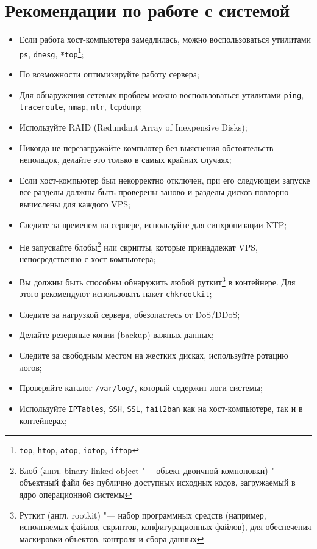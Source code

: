 \section{Рекомендации по работе с системой}
\begin{itemize}
    \item Если работа хост-компьютера замедлилась, можно воспользоваться утилитами \texttt{ps}, \texttt{dmesg}, \texttt{*top}\footnote{\texttt{top}, \texttt{htop}, \texttt{atop}, \texttt{iotop}, \texttt{iftop}};
    \item По возможности оптимизируйте работу сервера;
    \item Для обнаружения сетевых проблем можно воспользоваться утилитами \texttt{ping}, \texttt{traceroute}, \texttt{nmap}, \texttt{mtr}, \texttt{tcpdump};
    \item Используйте RAID (Redundant Array of Inexpensive Disks);
    \item Никогда не перезагружайте компьютер без выяснения обстоятельств неполадок, делайте это только в самых крайних случаях;
    \item Если хост-компьютер был некорректно отключен, при его следующем запуске все разделы должны быть проверены заново и разделы дисков повторно вычислены для каждого VPS;
    \item Следите за временем на сервере, используйте для синхронизации NTP;
    \item Не запускайте блобы\footnote{Блоб (англ. binary linked object "--- объект двоичной компоновки) "--- объектный файл без публично доступных исходных кодов, загружаемый в ядро операционной системы} или скрипты, которые принадлежат VPS, непосредственно с хост-компьютера;
    \item Вы должны быть способны обнаружить любой руткит\footnote{Руткит (англ. rootkit) "--- набор программных средств (например, исполняемых файлов, скриптов, конфигурационных файлов), для обеспечения маскировки объектов, контроля и сбора данных} в контейнере. Для этого рекомендуют использовать пакет \texttt{chkrootkit};
    \item Следите за нагрузкой сервера, обезопастесь от DoS/DDoS;
    \item Делайте резервные копии (backup) важных данных;
    \item Следите за свободным местом на жестких дисках, используйте ротацию логов;
    \item Проверяйте каталог \texttt{/var/log/}, который содержит логи системы;
    \item Используйте \texttt{IPTables}, \texttt{SSH}, \texttt{SSL}, \texttt{fail2ban} как на хост-компьютере, так и в контейнерах;

\end{itemize}
